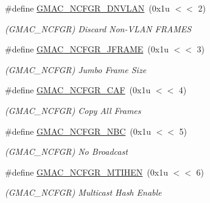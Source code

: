 \begin{DoxyCompactItemize}
\mbox{\label{group__SAMV71__GMAC_ga4f173040c3b513a7026508f63b4f4631}} 
\#define \mbox{\hyperlink{group__SAMV71__GMAC_ga4f173040c3b513a7026508f63b4f4631}{G\+M\+A\+C\+\_\+\+N\+C\+F\+G\+R\+\_\+\+D\+N\+V\+L\+AN}}~(0x1u $<$$<$ 2)
\begin{DoxyCompactList}\small\item\em (G\+M\+A\+C\+\_\+\+N\+C\+F\+GR) Discard Non-\/\+V\+L\+AN F\+R\+A\+M\+ES \end{DoxyCompactList}\item 
\mbox{\label{group__SAMV71__GMAC_ga6cee1ff5af7a4e23016e2ee32aa24faf}} 
\#define \mbox{\hyperlink{group__SAMV71__GMAC_ga6cee1ff5af7a4e23016e2ee32aa24faf}{G\+M\+A\+C\+\_\+\+N\+C\+F\+G\+R\+\_\+\+J\+F\+R\+A\+ME}}~(0x1u $<$$<$ 3)
\begin{DoxyCompactList}\small\item\em (G\+M\+A\+C\+\_\+\+N\+C\+F\+GR) Jumbo Frame Size \end{DoxyCompactList}\item 
\mbox{\label{group__SAMV71__GMAC_ga69ce10f9318ec8b52be3c1483c9a047a}} 
\#define \mbox{\hyperlink{group__SAMV71__GMAC_ga69ce10f9318ec8b52be3c1483c9a047a}{G\+M\+A\+C\+\_\+\+N\+C\+F\+G\+R\+\_\+\+C\+AF}}~(0x1u $<$$<$ 4)
\begin{DoxyCompactList}\small\item\em (G\+M\+A\+C\+\_\+\+N\+C\+F\+GR) Copy All Frames \end{DoxyCompactList}\item 
\mbox{\label{group__SAMV71__GMAC_gae4e763f19d21a3cdae1a9b64d2df5937}} 
\#define \mbox{\hyperlink{group__SAMV71__GMAC_gae4e763f19d21a3cdae1a9b64d2df5937}{G\+M\+A\+C\+\_\+\+N\+C\+F\+G\+R\+\_\+\+N\+BC}}~(0x1u $<$$<$ 5)
\begin{DoxyCompactList}\small\item\em (G\+M\+A\+C\+\_\+\+N\+C\+F\+GR) No Broadcast \end{DoxyCompactList}\item 
\mbox{\label{group__SAMV71__GMAC_ga7dbf1bcaaab412b3245e33c67125d762}} 
\#define \mbox{\hyperlink{group__SAMV71__GMAC_ga7dbf1bcaaab412b3245e33c67125d762}{G\+M\+A\+C\+\_\+\+N\+C\+F\+G\+R\+\_\+\+M\+T\+I\+H\+EN}}~(0x1u $<$$<$ 6)
\begin{DoxyCompactList}\small\item\em (G\+M\+A\+C\+\_\+\+N\+C\+F\+GR) Multicast Hash Enable \end{DoxyCompactList}\item 
$$
\end{DoxyCompactItemize}
